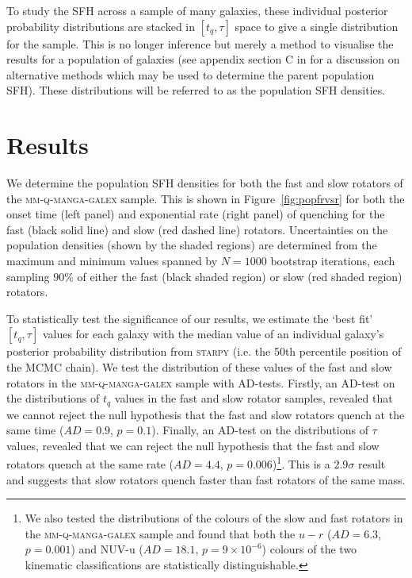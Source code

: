 \documentclass[useAMS,usenatbib]{mn2e}
\begin{document}
To study the SFH across a sample of many galaxies, these individual posterior probability distributions are stacked in $[t_q, \tau]$ space to give a single distribution for the sample. This is no longer inference but merely a method to visualise the results for a population of galaxies (see appendix section C in \citealt{smethurst16} for a discussion on alternative methods which may be used to determine the parent population SFH). These distributions will be referred to as the population SFH densities.

\section{Results}\label{sec:results}

We determine the population SFH densities for both the fast and slow rotators of the \textsc{mm-q-manga-galex} sample. This is shown in Figure~\ref{fig:popfrvsr} for both the onset time (left panel) and exponential rate (right panel) of quenching for the fast (black solid line) and slow (red dashed line) rotators. Uncertainties on the population densities (shown by the shaded regions) are determined from the maximum and minimum values spanned by $N = 1000$ bootstrap iterations, each sampling $90\%$ of either the fast (black shaded region) or slow (red shaded region) rotators. 

To statistically test the significance of our results, we estimate the `best fit' $[t_q, \tau]$ values for each galaxy with the median value of an individual galaxy's posterior probability distribution from \textsc{starpy} (i.e. the 50th percentile position of the MCMC chain). We test the distribution of these values of the fast and slow rotators in the \textsc{mm-q-manga-galex} sample with AD-tests. Firstly, an AD-test on the distributions of $t_q$ values in the fast and slow rotator samples, revealed that we cannot reject the null hypothesis that the fast and slow rotators quench at the same time ($AD= 0.9$, $p = 0.1$). Finally, an AD-test on the distributions of $\tau$ values, revealed that we can reject the null hypothesis that the fast and slow rotators quench at the same rate ($AD= 4.4$, $p = 0.006$)\footnote{We also tested the distributions of the colours of the slow and fast rotators in the \textsc{mm-q-manga-galex} sample and found that both the $u-r$ ($AD= 6.3$, $p = 0.001$) and NUV-u ($AD= 18.1$, $p = 9\times10^{-6}$) colours of the two kinematic classifications are statistically distinguishable.}. This is a $2.9\sigma$ result and suggests that slow rotators quench faster than fast rotators of the same mass.
\end{document}

